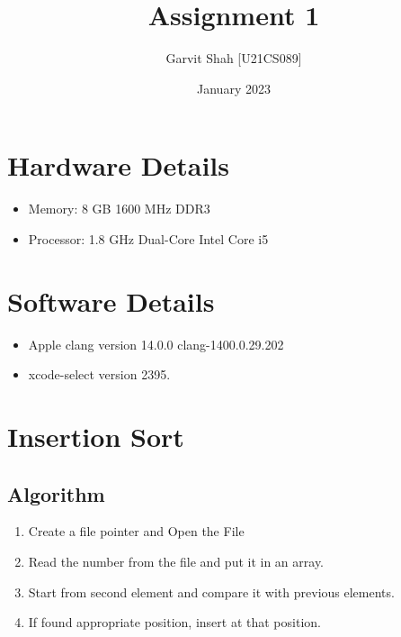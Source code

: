 \documentclass{article}
\title{Assignment 1}
\author{Garvit Shah [U21CS089]}
\date{January 2023}
\begin{document}
   \maketitle

   \section*{Hardware Details}
   \begin{itemize}
    \item Memory: 8 GB 1600 MHz DDR3
    \item Processor: 1.8 GHz Dual-Core Intel Core i5
  \end{itemize}

  \section*{Software Details}
  \begin{itemize}
   \item Apple clang version 14.0.0 clang-1400.0.29.202
   \item xcode-select version 2395.
  \end{itemize}

   \section{Insertion Sort}
   \subsection{Algorithm}
   \begin{enumerate}
    \item Create a file pointer and Open the File
    \item Read the number from the file and put it in an array.
    \item Start from second element and compare it with previous elements.
    \item If found appropriate position, insert at that position.
   \end{enumerate}
   
\end{document}
